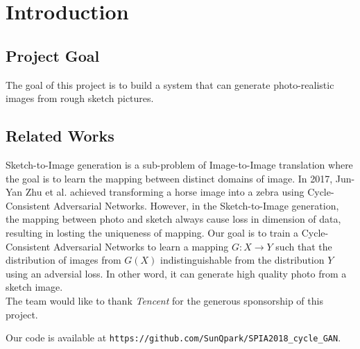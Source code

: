 \chapter{Introduction}\label{Ch:Introduction}

\section{Project Goal}

The goal of this project is to build a system that can generate photo-realistic images from rough sketch pictures. 

\section{Related Works}

Sketch-to-Image generation is a sub-problem of Image-to-Image translation where the goal is to 
learn the mapping between distinct domains of image. 
In 2017, Jun-Yan Zhu et al. achieved transforming a horse image into a zebra using Cycle-Consistent Adversarial Networks. However, in the Sketch-to-Image generation, the mapping between photo and sketch always cause loss in dimension of data, resulting in losting the uniqueness of mapping. Our goal is to train a Cycle-Consistent Adversarial Networks to learn a mapping \(G:X \rightarrow Y\) such that the distribution of images from \(G(X)\) indistinguishable from the distribution \(Y\) using an adversial loss. In other word, it can generate high quality photo from a sketch image.\\%


The team would like to thank \emph{Tencent} for the generous sponsorship of this project. 



Our code is available at \texttt{https://github.com/SunQpark/SPIA2018\_cycle\_GAN}.




\endinput

